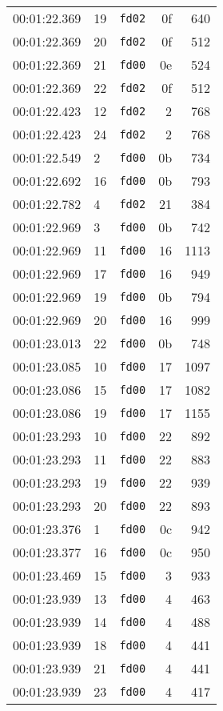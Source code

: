 \documentclass{article}
\begin{document}
\begin{longtable}{lllrr}
00:01:22.369 & 19 & \texttt{fd02} & 0f & 640 \\
00:01:22.369 & 20 & \texttt{fd02} & 0f & 512 \\
00:01:22.369 & 21 & \texttt{fd00} & 0e & 524 \\
00:01:22.369 & 22 & \texttt{fd02} & 0f & 512 \\
00:01:22.423 & 12 & \texttt{fd02} & 2 & 768 \\
00:01:22.423 & 24 & \texttt{fd02} & 2 & 768 \\
00:01:22.549 & 2 & \texttt{fd00} & 0b & 734 \\
00:01:22.692 & 16 & \texttt{fd00} & 0b & 793 \\
00:01:22.782 & 4 & \texttt{fd02} & 21 & 384 \\
00:01:22.969 & 3 & \texttt{fd00} & 0b & 742 \\
00:01:22.969 & 11 & \texttt{fd00} & 16 & 1113 \\
00:01:22.969 & 17 & \texttt{fd00} & 16 & 949 \\
00:01:22.969 & 19 & \texttt{fd00} & 0b & 794 \\
00:01:22.969 & 20 & \texttt{fd00} & 16 & 999 \\
00:01:23.013 & 22 & \texttt{fd00} & 0b & 748 \\
00:01:23.085 & 10 & \texttt{fd00} & 17 & 1097 \\
00:01:23.086 & 15 & \texttt{fd00} & 17 & 1082 \\
00:01:23.086 & 19 & \texttt{fd00} & 17 & 1155 \\
00:01:23.293 & 10 & \texttt{fd00} & 22 & 892 \\
00:01:23.293 & 11 & \texttt{fd00} & 22 & 883 \\
00:01:23.293 & 19 & \texttt{fd00} & 22 & 939 \\
00:01:23.293 & 20 & \texttt{fd00} & 22 & 893 \\
00:01:23.376 & 1 & \texttt{fd00} & 0c & 942 \\
00:01:23.377 & 16 & \texttt{fd00} & 0c & 950 \\
00:01:23.469 & 15 & \texttt{fd00} & 3 & 933 \\
00:01:23.939 & 13 & \texttt{fd00} & 4 & 463 \\
00:01:23.939 & 14 & \texttt{fd00} & 4 & 488 \\
00:01:23.939 & 18 & \texttt{fd00} & 4 & 441 \\
00:01:23.939 & 21 & \texttt{fd00} & 4 & 441 \\
00:01:23.939 & 23 & \texttt{fd00} & 4 & 417 \\

\end{longtable}
\end{document}
